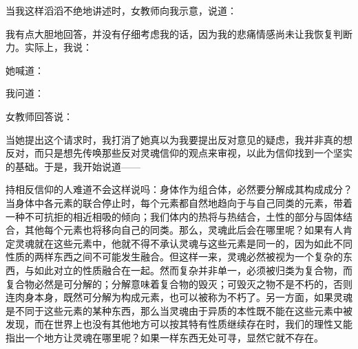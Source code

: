 当我这样滔滔不绝地讲述时，女教师向我示意，说道：\par

我有点大胆地回答，并没有仔细考虑我的话，因为我的悲痛情感尚未让我恢复判断力。实际上，我说：\par

她喊道：\par

我问道：\par

女教师回答说：\par

当她提出这个请求时，我打消了她真以为我要提出反对意见的疑虑，我并非真的想反对，而只是想先传唤那些反对灵魂信仰的观点来审视，以此为信仰找到一个坚实的基础。于是，我开始说道——\par

持相反信仰的人难道不会这样说吗：身体作为组合体，必然要分解成其构成成分？当身体中各元素的联合停止时，每个元素都自然地趋向于与自己同类的元素，带着一种不可抗拒的相近相吸的倾向；我们体内的热将与热结合，土性的部分与固体结合，其他每个元素也将移向自己的同类。那么，灵魂此后会在哪里呢？如果有人肯定灵魂就在这些元素中，他就不得不承认灵魂与这些元素是同一的，因为如此不同性质的两样东西之间不可能发生融合。但这样一来，灵魂必然被视为一个复杂的东西，与如此对立的性质融合在一起。然而复杂并非单一，必须被归类为复合物，而复合物必然是可分解的；分解意味着复合物的毁灭；可毁灭之物不是不朽的，否则连肉身本身，既然可分解为构成元素，也可以被称为不朽了。另一方面，如果灵魂是不同于这些元素的某种东西，那么当灵魂由于异质的本性既不能在这些元素中被发现，而在世界上也没有其他地方可以按其特有性质继续存在时，我们的理性又能指出一个地方让灵魂在哪里呢？如果一样东西无处可寻，显然它就不存在。\par

